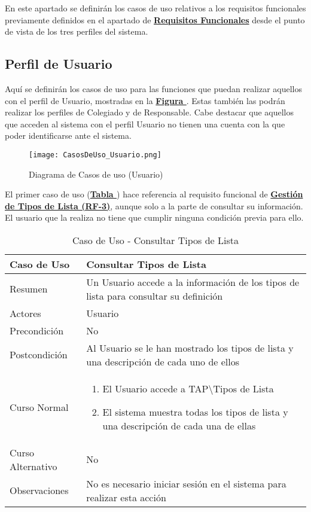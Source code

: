 En este apartado se definirán los casos de uso relativos a los requisitos funcionales previamente definidos en el apartado de \textbf{\hyperref[lrf]{Requisitos Funcionales}} desde el punto de vista de los tres perfiles del sistema.


\subsection{Perfil de Usuario}


\addtocounter{figura}{1}
Aquí se definirán los casos de uso para las funciones que puedan realizar aquellos con el perfil de Usuario, mostradas en la \textbf{\hyperref[fig:CasosDeUso_Usuario]{Figura }}. Estas también las podrán realizar los perfiles de Colegiado y de Responsable. Cabe destacar que aquellos que acceden al sistema con el perfil Usuario no tienen una cuenta con la que poder identificarse ante el sistema.

\begin{figure}[!htbp]
  \centering
  \texttt{[image: CasosDeUso\_Usuario.png]}
  \caption{Diagrama de Casos de uso (Usuario)}
  \label{fig:CasosDeUso_Usuario}
\end{figure}
\FloatBarrier
 \pagebreak

\addtocounter{tabla}{1}
El primer caso de uso (\textbf{\hyperref[tab:cuuConsultaTiposLst]{Tabla }}) hace referencia al requisito funcional de \textbf{\hyperref[tab:rfGestTipoLst]{Gestión de Tipos de Lista (RF-3)}}, aunque solo a la parte de consultar su información. El usuario que la realiza no tiene que cumplir ninguna condición previa para ello.

\begin{table}[!htbp]
  \centering  \addtocounter{casouso}{1}
  \begin{tabular}{|l | p{100mm}|}
    \textbf{Caso de Uso}  & \textbf{Consultar Tipos de Lista} \\ \hline
    Resumen 		 & Un Usuario accede a la información de los tipos de lista para consultar su definición \\ \hline
    Actores  		 & Usuario \\ \hline
    Precondición  	 & No \\ \hline
    Postcondición  	 & Al Usuario se le han mostrado los tipos de lista y una descripción de cada uno de ellos \\ \hline
    Curso Normal   	 & \begin{enumerate}
	  \item El Usuario accede a TAP\textbackslash Tipos de Lista
	  \item El sistema muestra todas los tipos de lista y una descripción de cada una de ellas
    \end{enumerate}  \\ \hline
    Curso Alternativo  & No  \\ \hline
    Observaciones 	 & No es necesario iniciar sesión en el sistema para realizar esta acción  \\ \hline
  \end{tabular}
  \caption{Caso de Uso  - Consultar Tipos de Lista}
  \label{tab:cuuConsultaTiposLst}
\end{table}
\FloatBarrier

